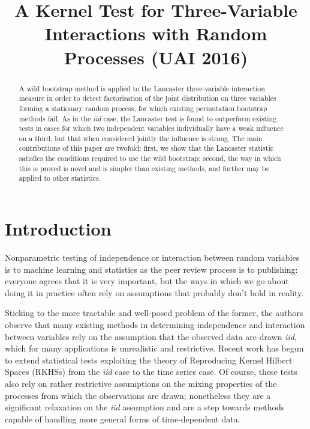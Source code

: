 \documentclass[]{article}
\title{A Kernel Test for Three-Variable Interactions with Random Processes (UAI 2016)}
\author{} %
\begin{document}
\maketitle

\begin{abstract} 

A wild bootstrap method is applied to the \cite{doukhan1994mixing} Lancaster three-variable interaction measure in order to detect factorisation of the joint distribution on three variables forming a stationary random process, for which existing permutation bootstrap methods fail. As in the \emph{iid} case, the Lancaster test is found to outperform existing tests in cases for which two independent variables individually have a weak influence on a third, but that when considered jointly the influence is strong. The main contributions of this paper are twofold: first, we show that the Lancaster statistic satisfies the conditions required to use the wild bootstrap; second, the way in which this is proved is novel and is simpler than existing methods, and further may be applied to other statistics.

\end{abstract} 

\section{Introduction}
\label{introduction}

Nonparametric testing of independence or interaction between random variables is to machine learning and statistics as the peer review process is to publishing: everyone agrees that it is very important, but the ways in which we go about doing it in practice often rely on assumptions that probably don't hold in reality. 

Sticking to the more tractable and well-posed problem of the former, the authors observe that many existing methods in determining independence and interaction between variables rely on the assumption that the observed data are drawn \emph{iid}, which for many applications is unrealistic and restrictive. Recent work has begun to extend statistical tests exploiting the theory of Reproducing Kernel Hilbert Spaces (RKHSs) from the \emph{iid} case to the time series case. Of course, these tests also rely on rather restrictive assumptions on the mixing properties of the processes from which the observations are drawn; nonetheless they are a significant relaxation on the \emph{iid} assumption and are a step towards methods capable of handling more general forms of time-dependent data. 
\end{document}
